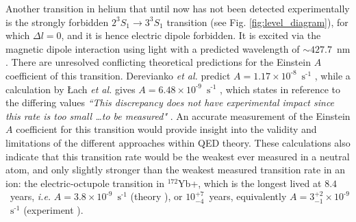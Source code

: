 \documentclass[%
 reprint,
 amsmath,amssymb,
 aps,
 prl,
]{revtex4-2}
\newcommand{\brycecom}[1]{{\color{ProcessBlue}[{#1}]\normalcolor}} %
\newcommand{\UpperState}{3^{3\!}S_1}%
\newcommand{\MetastableState}{2^{3\!}S_1}%
\begin{document}

Another transition in helium that until now has not been detected experimentally is the strongly forbidden \(\MetastableState \rightarrow \UpperState\) transition (see Fig. \ref{fig:level_diagram}), for which \(\Delta l = 0\), and it is hence electric dipole forbidden. It is excited via the magnetic dipole interaction using light with a predicted wavelength of \(\sim\)\(427.7\)~nm \cite{Drake2006}. 
There are unresolved conflicting theoretical predictions for the Einstein \(A\) coefficient of this transition. Derevianko \textit{et al.} predict \(A=1.17\times10^{\text{-}8}\)~\(\text{s}^{\text{-}1}\) \cite{PhysRevA.58.4453}, while a calculation by \L{}ach \textit{et al.} gives \(A=6.48\times10^{\text{-}9}\)~\(\text{s}^{\text{-}1}\) \cite{PhysRevA.64.042510}, which states in reference to the differing values \textit{``This discrepancy does not have experimental impact since this rate is too small \ldots to be measured"} \cite{PhysRevA.64.042510}. An accurate measurement of the Einstein \(A\) coefficient for this transition would provide insight into the validity and limitations of the different approaches within QED theory. These calculations also indicate that this transition rate would be the weakest ever measured in a neutral atom, and only slightly stronger than the weakest measured transition rate in an ion: the electric-octupole transition in \(^{172}\)Yb+, which is the longest lived at \(8.4\)~years, \textit{i.e.} \(A = 3.8\times10^{\text{-}9}\)~\(\text{s}^{\text{-}1}\) (theory \cite{PhysRevLett.81.3345}), or \(10^{+7}_{-4}\)~years, equivalently \(A = 3^{+2}_{-1}\times10^{\text{-}9}\)~\(\text{s}^{\text{-}1}\) (experiment \cite{PhysRevLett.78.1876}).
\end{document}
